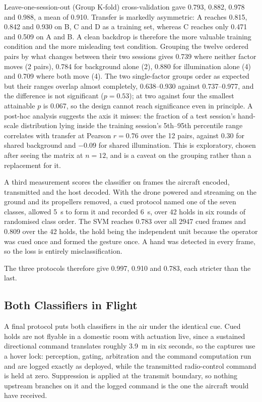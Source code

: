 \documentclass[conference]{IEEEtran}
\begin{document}
Leave-one-session-out (Group K-fold) cross-validation gave 0.793, 0.882, 0.978 and 0.988, a mean of 0.910.
Transfer is markedly asymmetric: A reaches 0.815, 0.842 and 0.930 on B, C and D as a training set, whereas C reaches only 0.471 and 0.509 on A and B.
A clean backdrop is therefore the more valuable training condition and the more
misleading test condition.
Grouping the twelve ordered pairs by what changes between their two sessions
gives 0.739 where neither factor moves (2 pairs), 0.784 for background alone
(2), 0.880 for illumination alone (4) and 0.709 where both move (4).
The two single-factor groups order as expected but their ranges overlap almost
completely, 0.638--0.930 against 0.737--0.977, and the difference is not
significant ($p=0.53$); at two against four the smallest attainable $p$ is
0.067, so the design cannot reach significance even in principle.
A post-hoc analysis suggests the axis it misses: the fraction of a test
session's hand-scale distribution lying inside the training session's
5th--95th percentile range correlates with transfer at Pearson $r=0.76$ over the 12
pairs, against 0.30 for shared background and $-0.09$ for shared illumination.
This is exploratory, chosen after seeing the matrix at $n=12$, and is a caveat
on the grouping rather than a replacement for it.

A third measurement scores the classifier on frames the aircraft encoded,
transmitted and the host decoded.
With the drone powered and streaming on the ground and its propellers removed,
a cued protocol named one of the seven classes, allowed 5~s to form it and
recorded 6~s, over 42 holds in six rounds of randomised class order.
The SVM reaches 0.783 over all 2947 cued frames and 0.809 over the 42 holds, the
hold being the independent unit because the operator was cued once and formed
the gesture once.
A hand was detected in every frame, so the loss is entirely misclassification.

The three protocols therefore give 0.997, 0.910 and 0.783, each stricter than
the last.

\subsection{Both Classifiers in Flight}
\label{sec:inflight}



A final protocol puts both classifiers in the air under the identical cue.
Cued holds are not flyable in a domestic room with actuation live, since a
sustained directional command translates roughly 3.9~m in six seconds, so the
captures use a hover lock: perception, gating, arbitration and the command
computation run and are logged exactly as deployed, while the transmitted
radio-control command is held at zero.
Suppression is applied at the transmit boundary, so nothing upstream branches on
it and the logged command is the one the aircraft would have received.
\end{document}
